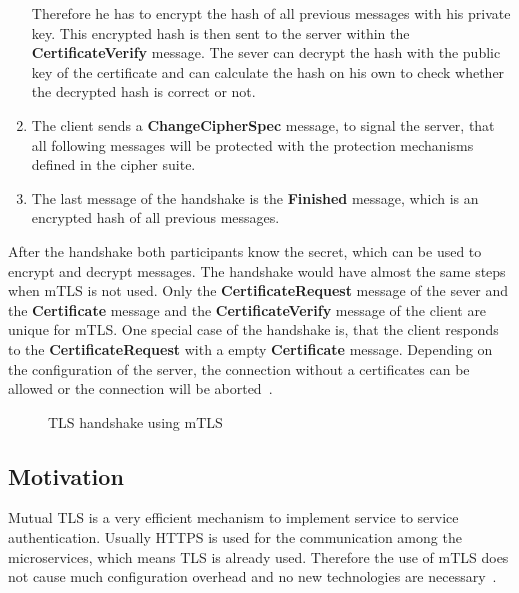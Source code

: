 \begin{enumerate}
		Therefore he has to encrypt the hash of all previous messages with his private key.
		This encrypted hash is then sent to the server within the \textbf{CertificateVerify} message.
		The sever can decrypt the hash with the public key of the certificate and can calculate the hash on his own to check whether the decrypted hash is correct or not.
	\item The client sends a \textbf{ChangeCipherSpec} message, to signal the server, that all following messages will be protected with the protection mechanisms defined in the cipher suite.
	\item The last message of the handshake is the \textbf{Finished} message, which is an encrypted hash of all previous messages.
\end{enumerate}
After the handshake both participants know the secret, which can be used to encrypt and decrypt messages.
The handshake would have almost the same steps when mTLS is not used.
Only the \textbf{CertificateRequest} message of the sever and the \textbf{Certificate} message and the \textbf{CertificateVerify} message of the client are unique for mTLS.
One special case of the handshake is, that the client responds to the \textbf{CertificateRequest} with a empty \textbf{Certificate} message.
Depending on the configuration of the server, the connection without a certificates can be allowed or the connection will be aborted~\cite{parsovs2013practical}.

\begin{figure}
    \centering
    \caption{TLS handshake using mTLS~\cite{parsovs2013practical}}
    \label{fig:tlshandshake}
\end{figure}

\subsection{Motivation}
Mutual TLS is a very efficient mechanism to implement service to service authentication.
Usually HTTPS is used for the communication among the microservices, which means TLS is already used.
Therefore the use of mTLS does not cause much configuration overhead and no new technologies are necessary~\cite{dias2020microservices}.

